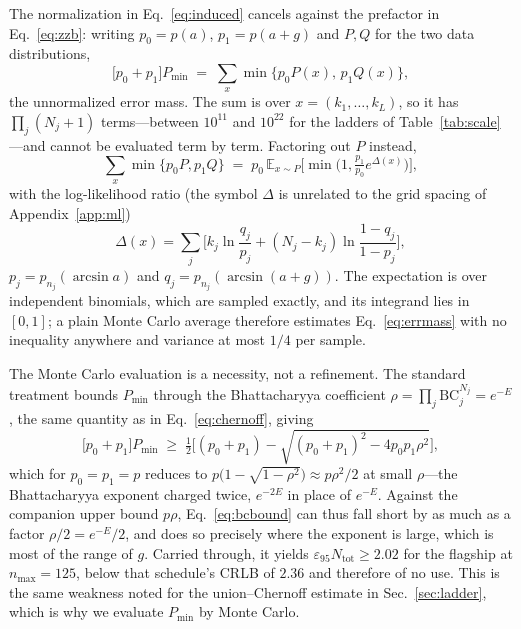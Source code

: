 \documentclass[%
 twocolumn,
 amsmath,amssymb,
prx,
longbibliography
]{revtex4-2}
\newcommand{\Ntot}{N_{\mathrm{tot}}}
\begin{document}
The normalization in Eq.~\eqref{eq:induced} cancels against the prefactor in Eq.~\eqref{eq:zzb}: writing $p_0 = p(a)$, $p_1 = p(a{+}g)$ and $P, Q$ for the two data distributions,
\begin{equation}\label{eq:errmass}
    \big[p_0 + p_1\big] P_{\min} \;=\; \sum_x \min\big\{p_0 P(x),\, p_1 Q(x)\big\} ,
\end{equation}
the unnormalized error mass. The sum is over $x = (k_1, \dots, k_L)$, so it has $\prod_j (N_j + 1)$ terms---between $10^{11}$ and $10^{22}$ for the ladders of Table~\ref{tab:scale}---and cannot be evaluated term by term. Factoring out $P$ instead,
\begin{equation}\label{eq:pminmc}
    \sum_x \min\big\{p_0 P, p_1 Q\big\} \;=\; p_0\, \mathbb{E}_{x \sim P}\Big[\min\big(1, \tfrac{p_1}{p_0} e^{\Delta(x)}\big)\Big],
\end{equation}
with the log-likelihood ratio (the symbol $\Delta$ is unrelated to the grid spacing of Appendix~\ref{app:ml})
\begin{equation}
    \Delta(x) = \sum_j \Big[ k_j \ln \frac{q_j}{p_j} + (N_j - k_j) \ln \frac{1-q_j}{1-p_j} \Big],
\end{equation}
$p_j = p_{n_j}(\arcsin a)$ and $q_j = p_{n_j}(\arcsin(a{+}g))$. The expectation is over independent binomials, which are sampled exactly, and its integrand lies in $[0,1]$; a plain Monte Carlo average therefore estimates Eq.~\eqref{eq:errmass} with no inequality anywhere and variance at most $1/4$ per sample.

The Monte Carlo evaluation is a necessity, not a refinement. The standard treatment bounds $P_{\min}$ through the Bhattacharyya coefficient $\rho = \prod_j \mathrm{BC}_j^{N_j} = e^{-E}$, the same quantity as in Eq.~\eqref{eq:chernoff}, giving
\begin{equation}\label{eq:bcbound}
    \big[p_0 + p_1\big] P_{\min} \;\ge\; \tfrac12\Big[(p_0{+}p_1) - \sqrt{(p_0{+}p_1)^2 - 4 p_0 p_1 \rho^2}\Big] ,
\end{equation}
which for $p_0 = p_1 = p$ reduces to $p\big(1 - \sqrt{1-\rho^2}\big) \approx p \rho^2/2$ at small $\rho$---the Bhattacharyya exponent charged twice, $e^{-2E}$ in place of $e^{-E}$. Against the companion upper bound $p\rho$, Eq.~\eqref{eq:bcbound} can thus fall short by as much as a factor $\rho/2 = e^{-E}/2$, and does so precisely where the exponent is large, which is most of the range of $g$. Carried through, it yields $\varepsilon_{95}\Ntot \ge 2.02$ for the flagship at $n_{\max} = 125$, below that schedule's \ac{CRLB} of $2.36$ and therefore of no use. This is the same weakness noted for the union--Chernoff estimate in Sec.~\ref{sec:ladder}, which is why we evaluate $P_{\min}$ by Monte Carlo.
\end{document}
